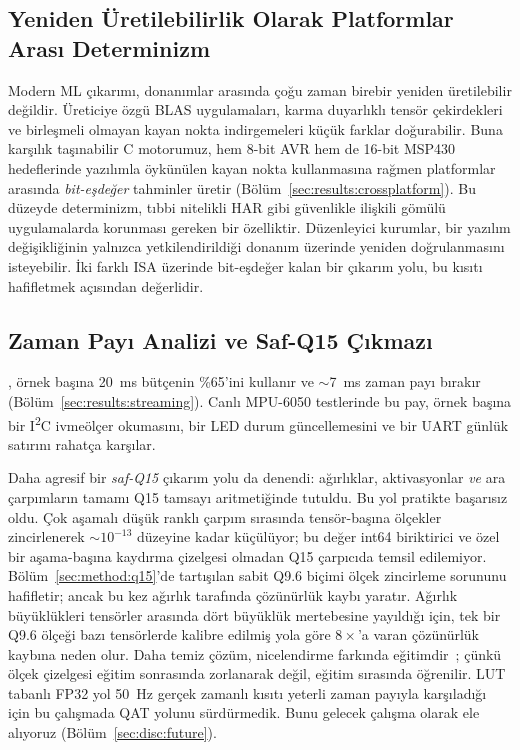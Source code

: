 \subsection{Yeniden Üretilebilirlik Olarak Platformlar Arası Determinizm}
\label{sec:disc:determinism}

Modern ML çıkarımı, donanımlar arasında çoğu zaman birebir yeniden
üretilebilir değildir. Üreticiye özgü BLAS uygulamaları, karma
duyarlıklı tensör çekirdekleri ve birleşmeli olmayan kayan nokta
indirgemeleri küçük farklar doğurabilir. Buna karşılık taşınabilir C
motorumuz, hem 8-bit AVR hem de 16-bit MSP430 hedeflerinde yazılımla
öykünülen kayan nokta kullanmasına rağmen platformlar arasında
\emph{bit-eşdeğer} tahminler üretir
(Bölüm~\ref{sec:results:crossplatform}). Bu düzeyde determinizm,
tıbbi nitelikli HAR gibi güvenlikle ilişkili gömülü uygulamalarda
korunması gereken bir özelliktir. Düzenleyici kurumlar, bir yazılım
değişikliğinin yalnızca yetkilendirildiği donanım üzerinde yeniden
doğrulanmasını isteyebilir. İki farklı ISA üzerinde bit-eşdeğer kalan
bir çıkarım yolu, bu kısıtı hafifletmek açısından değerlidir.

\subsection{Zaman Payı Analizi ve Saf-Q15 Çıkmazı}
\label{sec:disc:headroom}

\msp{}, örnek başına 20~ms bütçenin \%65'ini kullanır ve
$\sim$7~ms zaman payı bırakır (Bölüm~\ref{sec:results:streaming}).
Canlı MPU-6050 testlerinde bu pay, örnek başına bir
I\textsuperscript{2}C ivmeölçer okumasını, bir LED durum
güncellemesini ve bir UART günlük satırını rahatça karşılar.

Daha agresif bir \emph{saf-Q15} çıkarım yolu da denendi: ağırlıklar,
aktivasyonlar \emph{ve} ara çarpımların tamamı Q15 tamsayı
aritmetiğinde tutuldu. Bu yol pratikte başarısız oldu. Çok aşamalı
düşük ranklı çarpım sırasında tensör-başına ölçekler zincirlenerek
$\sim$$10^{-13}$ düzeyine kadar küçülüyor; bu değer int64 biriktirici
ve özel bir aşama-başına kaydırma çizelgesi olmadan Q15 çarpıcıda
temsil edilemiyor. Bölüm~\ref{sec:method:q15}'de tartışılan sabit
Q9.6 biçimi ölçek zincirleme sorununu hafifletir; ancak bu kez
ağırlık tarafında çözünürlük kaybı yaratır. Ağırlık büyüklükleri
tensörler arasında dört büyüklük mertebesine yayıldığı için, tek bir
Q9.6 ölçeği bazı tensörlerde kalibre edilmiş yola göre $8\times$'a
varan çözünürlük kaybına neden olur. Daha temiz çözüm,
nicelendirme farkında eğitimdir~\cite{hubara2017qnn}; çünkü ölçek
çizelgesi eğitim sonrasında zorlanarak değil, eğitim sırasında
öğrenilir. LUT tabanlı FP32 yol 50~Hz gerçek zamanlı kısıtı yeterli
zaman payıyla karşıladığı için bu çalışmada QAT yolunu sürdürmedik.
Bunu gelecek çalışma olarak ele alıyoruz
(Bölüm~\ref{sec:disc:future}).

